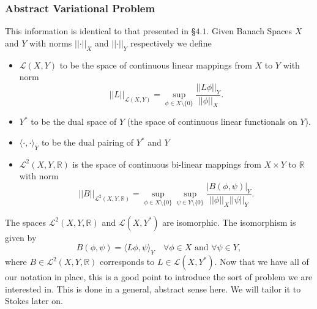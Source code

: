 \documentclass[12pt,a4paper]{article}
\theoremstyle{definition}
\begin{document}
\subsubsection{Abstract Variational Problem}\label{subsec_verf_abst_var_prob}
This information is identical to that presented in \cite{verfurth2013posteriori} \S $4.1$.  Given Banach Spaces $X$ and $Y$ with norms $\left|\left|\cdot\right|\right|_X$ and $\left|\left|\cdot\right|\right|_Y$ respectively we define
\begin{itemize}
	\item $\mathcal{L}\left(X,Y\right)$ to be the space of continuous linear mappings from $X$ to $Y$ with norm 
	\begin{equation}
	\left|\left|L\right|\right|_{\mathcal{L}\left(X,Y\right)} = \sup_{\phi \in X\setminus\lbrace 0\rbrace}\frac{\left|\left|L\phi\right|\right|_Y}{\left|\left|\phi\right|\right|_X}.
	\end{equation}
	\item $Y^*$ to be the dual space of $Y$ (the space of continuous linear functionals on $Y$).
	\item $\langle \cdot,\cdot\rangle_Y$ to be the dual pairing of $Y^*$ and $Y$
	\item $\mathcal{L}^2\left(X,Y,\mathbb{R}\right)$ is the space of continuous bi-linear mappings from $X\times Y$ to $\mathbb{R}$ with norm
	\begin{equation}
	\left|\left|B\right|\right|_{\mathcal{L}^2\left(X,Y,\mathbb{R}\right)} = \sup_{\phi \in X\setminus\lbrace 0\rbrace}\sup_{\psi \in Y\setminus\lbrace 0\rbrace}\frac{\left|B\left(\phi,\psi\right)\right|_Y}{\left|\left|\phi\right|\right|_X\left|\left|\psi\right|\right|_Y}.
	\end{equation}
\end{itemize}
The spaces $\mathcal{L}^2\left(X,Y,\mathbb{R}\right)$ and $\mathcal{L}\left(X,Y^*\right)$ are isomorphic.  The isomorphism is given by 
\begin{equation}\label{verf_isomorphism}
B\left(\phi,\psi\right)=\langle L\phi,\psi\rangle_Y\quad \forall \phi \in X\text{ and }\forall \psi \in Y,
\end{equation}
where $B\in \mathcal{L}^2\left(X,Y,\mathbb{R}\right)$ corresponds to $L\in \mathcal{L}\left(X,Y^*\right)$.  Now that we have all of our notation in place, this is a good point to introduce the sort of problem we are interested in.  This is done in a general, abstract sense here.  We will tailor it to Stokes later on.
\end{document}
